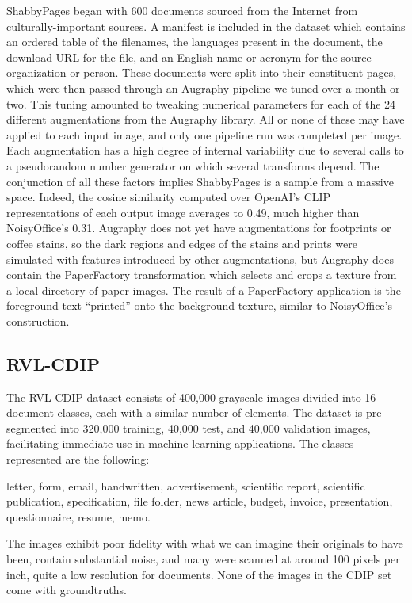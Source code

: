 \documentclass[runningheads]{llncs}
\begin{document}
ShabbyPages began with 600 documents sourced from the Internet from culturally-important sources.
A manifest is included in the dataset which contains an ordered table of the filenames, the languages present in the document, the download URL for the file, and an English name or acronym for the source organization or person.
These documents were split into their constituent pages, which were then passed through an Augraphy pipeline we tuned over a month or two.
This tuning amounted to tweaking numerical parameters for each of the 24 different augmentations from the Augraphy library.
All or none of these may have applied to each input image, and only one pipeline run was completed per image.
Each augmentation has a high degree of internal variability due to several calls to a pseudorandom number generator on which several transforms depend.
The conjunction of all these factors implies ShabbyPages is a sample from a massive space.
Indeed, the cosine similarity computed over OpenAI's CLIP representations of each output image averages to 0.49, much higher than NoisyOffice's 0.31.
Augraphy does not yet have augmentations for footprints or coffee stains, so the dark regions and edges of the stains and prints were simulated with features introduced by other augmentations, but Augraphy does contain the PaperFactory transformation which selects and crops a texture from a local directory of paper images.
The result of a PaperFactory application is the foreground text ``printed'' onto the background texture, similar to NoisyOffice's construction.

\subsection{RVL-CDIP}
The RVL-CDIP dataset \cite{ref_RVL-CDIP} consists of 400,000 grayscale images divided into 16 document classes, each with a similar number of elements.
The dataset is pre-segmented into 320,000 training, 40,000 test, and 40,000 validation images, facilitating immediate use in machine learning applications.
The classes represented are the following:

\begin{center}
letter, form, email, handwritten, advertisement, scientific report,
scientific publication, specification, file folder, news article,
budget, invoice, presentation, questionnaire, resume, memo.
\end{center}

The images exhibit poor fidelity with what we can imagine their originals to have been, contain substantial noise, and many were scanned at around 100 pixels per inch, quite a low resolution for documents.
None of the images in the CDIP set come with groundtruths.
\end{document}
